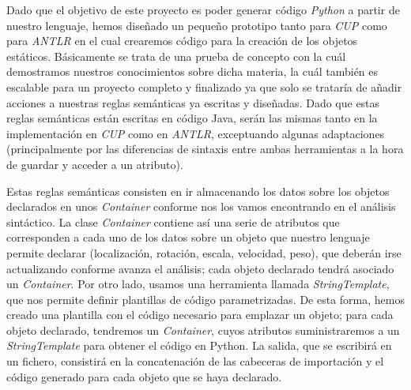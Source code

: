 \documentclass[12pt]{article}
\begin{document}
Dado que el objetivo de este proyecto es poder generar código \textit{Python} a partir de nuestro lenguaje, hemos diseñado un pequeño prototipo tanto para \textit{CUP} como para \textit{ANTLR} en el cual crearemos código para la creación de los objetos estáticos. Básicamente se trata de una prueba de concepto con la cuál demostramos nuestros conocimientos sobre dicha materia, la cuál también es escalable para un proyecto completo y finalizado ya que solo se trataría de añadir acciones a nuestras reglas semánticas ya escritas y diseñadas. Dado que estas reglas semánticas están escritas en código Java, serán las mismas tanto en la implementación en \textit{CUP} como en \textit{ANTLR}, exceptuando algunas adaptaciones (principalmente por las diferencias de sintaxis entre ambas herramientas a la hora de guardar y acceder a un atributo).

Estas reglas semánticas consisten en ir almacenando los datos sobre los objetos declarados en unos \textit{Container} conforme nos los vamos encontrando en el análisis sintáctico. La clase \textit{Container} contiene así una serie de atributos que corresponden a cada uno de los datos sobre un objeto que nuestro lenguaje permite declarar (localización, rotación, escala, velocidad, peso), que deberán irse actualizando conforme avanza el análisis; cada objeto declarado tendrá asociado un \textit{Container}. Por otro lado, usamos una herramienta llamada \textit{StringTemplate}, que nos permite definir plantillas de código parametrizadas. De esta forma, hemos creado una plantilla con el código necesario para emplazar un objeto; para cada objeto declarado, tendremos un \textit{Container}, cuyos atributos suministraremos a un \textit{StringTemplate} para obtener el código en Python. La salida, que se escribirá en un fichero, consistirá en la concatenación de las cabeceras de importación y el código generado para cada objeto que se haya declarado.

\newpage


\end{document}
